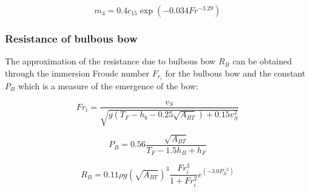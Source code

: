 \begin{equation}
    \label{eqn:m4}
    m_4 = 0.4 c_{15} \exp{(-0.034Fr^{-3.29})}
\end{equation}

\subsubsection*{Resistance of bulbous bow}

The approximation of the resistance due to bulbous bow $R_B$ can be obtained through the immersion Froude number $F_{r_i}$ for the bulbous bow and the constant $P_B$ which is a measure of the emergence of the bow: 

\begin{equation}
    \label{Fr_immersion}
    Fr_i = \frac{v_S}{\sqrt{g(T_F-h_b-0.25 \sqrt{A_{BT}})+0.15v_S^2}}
\end{equation}

\begin{equation}
    \label{Pb}
    P_B = 0.56 \frac{\sqrt{A_{BT}}}{T_F-1.5h_B+h_F}
\end{equation}

\begin{equation}
    \label{eqn:Rbulb}
    R_B = 0.11 \rho g (\sqrt{A_{BT}})^3 \frac{Fr_{i}^3}{1+Fr_{i}^2}e^{(-3.0P_B^{-2})}
\end{equation}

